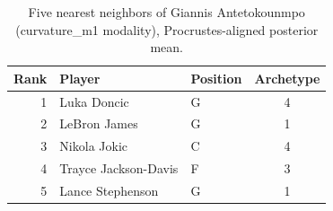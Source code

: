 \begin{table}[htbp]
  \centering\small
  \begin{tabular}{rllc}
    \toprule
    Rank & Player & Position & Archetype \\
    \midrule
    1 & Luka Doncic & G & 4 \\
    2 & LeBron James & G & 1 \\
    3 & Nikola Jokic & C & 4 \\
    4 & Trayce Jackson-Davis & F & 3 \\
    5 & Lance Stephenson & G & 1 \\
    \bottomrule
  \end{tabular}
  \caption{Five nearest neighbors of Giannis Antetokounmpo (curvature_m1 modality), Procrustes-aligned posterior mean.}
  \label{tab:Giannis_Antetokounmpo_neighbors_curvature_m1}
\end{table}

